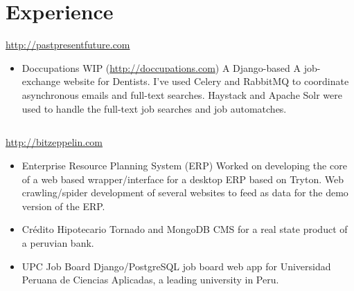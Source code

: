 \documentclass[11pt,a4paper,english]{moderncv}
\begin{document}
\maketitle

\section{Experience}
{
\url{http://pastpresentfuture.com}
\begin{itemize}
    \item Doccupations
        \newline
        WIP (\url{http://doccupations.com})
        \newline
        A Django-based A job-exchange website for Dentists. I've used Celery and RabbitMQ to coordinate asynchronous emails and full-text searches. Haystack and Apache Solr were used to handle the full-text job searches and job automatches.
\end{itemize}
}

\subsection{}

{
\url{http://bitzeppelin.com}
\newline{}
\begin{itemize}
    \item Enterprise Resource Planning System (ERP)
        \newline{}
	Worked on developing the core of a web based wrapper/interface for a desktop ERP based on Tryton. Web crawling/spider development of several websites to feed as data for the demo version of the ERP.
    \item Crédito Hipotecario
        \newline{}
        Tornado and MongoDB CMS for a real state product of a peruvian bank.
    \item UPC Job Board
        \newline{}
        Django/PostgreSQL job board web app for Universidad Peruana de Ciencias Aplicadas, a leading university in Peru.
\end{itemize}
}

\subsection{}
\end{document}
